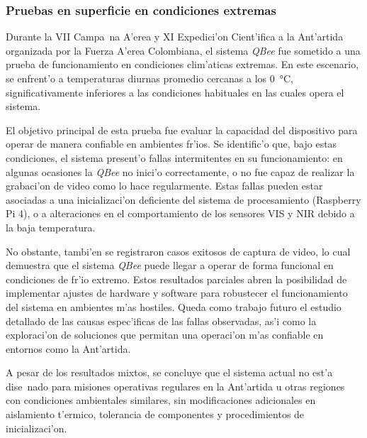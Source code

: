     \subsubsection{Pruebas en superficie en condiciones extremas}

    Durante la VII Campa~na A'erea y XI Expedici'on Cient'ifica a la Ant'artida organizada por la Fuerza A'erea Colombiana, el sistema \textit{QBee} fue sometido a una prueba de funcionamiento en condiciones clim'aticas extremas. En este escenario, se enfrent'o a temperaturas diurnas promedio cercanas a los \SI{0}{\celsius}, significativamente inferiores a las condiciones habituales en las cuales opera el sistema.
    
    \noindent El objetivo principal de esta prueba fue evaluar la capacidad del dispositivo para operar de manera confiable en ambientes fr'ios. Se identific'o que, bajo estas condiciones, el sistema present'o fallas intermitentes en su funcionamiento: en algunas ocasiones la \textit{QBee} no inici'o correctamente, o no fue capaz de realizar la grabaci'on de video como lo hace regularmente. Estas fallas pueden estar asociadas a una inicializaci'on deficiente del sistema de procesamiento (Raspberry Pi 4), o a alteraciones en el comportamiento de los sensores VIS y NIR debido a la baja temperatura.
    
    \noindent No obstante, tambi'en se registraron casos exitosos de captura de video, lo cual demuestra que el sistema \textit{QBee} puede llegar a operar de forma funcional en condiciones de fr'io extremo. Estos resultados parciales abren la posibilidad de implementar ajustes de hardware y software para robustecer el funcionamiento del sistema en ambientes m'as hostiles. Queda como trabajo futuro el estudio detallado de las causas espec'ificas de las fallas observadas, as'i como la exploraci'on de soluciones que permitan una operaci'on m'as confiable en entornos como la Ant'artida.
    
    \noindent A pesar de los resultados mixtos, se concluye que el sistema actual no est'a dise~nado para misiones operativas regulares en la Ant'artida u otras regiones con condiciones ambientales similares, sin modificaciones adicionales en aislamiento t'ermico, tolerancia de componentes y procedimientos de inicializaci'on.
    
